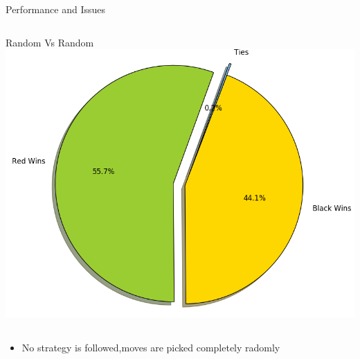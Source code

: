 \documentclass[aspectratio=169]{beamer}
\begin{document}
\begin{frame}{Performance and Issues}
  \begin{columns}
	 	\begin{column}{0.3\textwidth}
			Random Vs Random
			\includegraphics[scale = 0.35]{randVsrand.png}
	 	\end{column}
	\end{columns} 	

		
	\begin{itemize}
 		\item No strategy is followed,moves are picked completely radomly 
	\end{itemize}

\end{frame}
\end{document}
